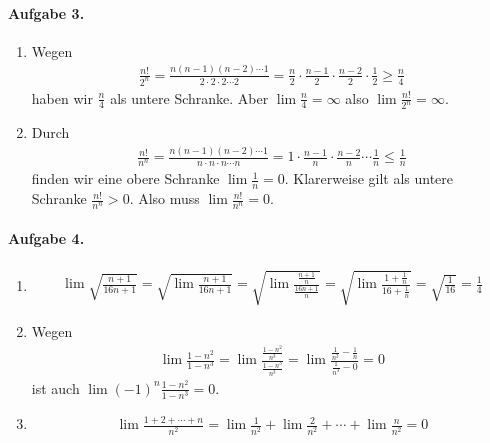 \documentclass{article}
\begin{document}
\paragraph{Aufgabe 3.}
\begin{enumerate} 
    \item
    Wegen
    \begin{align*}
        \frac{n!}{2^n} = \frac{n(n - 1)(n - 2)\cdots 1}{2 \cdot 2 \cdot 2 \cdots 2} = \frac{n}{2} \cdot \frac{n - 1}{2} \cdot \frac{n - 2}{2} \cdot \frac{1}{2} \geq \frac{n}{4}
    \end{align*}
    haben wir $\frac{n}{4}$ als untere Schranke. Aber $\lim \frac{n}{4} = \infty$ also $\lim \frac{n!}{2^n} = \infty$.

    \item Durch \begin{align*}
        \frac{n!}{n^n} = \frac{n(n - 1)(n - 2)\cdots 1}{n \cdot n \cdot n \cdots n} = 1 \cdot \frac{n - 1}{n} \cdot \frac{n - 2}{n} \cdots \frac{1}{n} \leq \frac{1}{n}
    \end{align*}
    finden wir eine obere Schranke $\lim \frac{1}{n} = 0$. Klarerweise gilt als untere Schranke $\frac{n!}{n^n} > 0$. Also muss $\lim \frac{n!}{n^n} = 0$.
\end{enumerate}

\paragraph{Aufgabe 4.}
\begin{enumerate}
    \item \begin{align*}
        \lim \sqrt{\frac{n + 1}{16n + 1}} = \sqrt{\lim \frac{n + 1}{16n + 1}} = \sqrt{\lim \frac{\frac{n + 1}{n}}{\frac{16n + 1}{n}}} = \sqrt{\lim \frac{1 + \frac{1}{n}}{16 + \frac{1}{n}}} = \sqrt{\frac{1}{16}} = \frac{1}{4}
    \end{align*}

    \item Wegen
    \begin{align*}
        \lim \frac{1 - n^2}{1 - n^3} = \lim \frac{\frac{1 - n^2}{n^3}}{\frac{1 - n^3}{n^3}} = \lim \frac{\frac{1}{n^3} - \frac{1}{n}}{\frac{1}{n^3} - 0} = 0
    \end{align*}
    ist auch $\lim (-1)^n \frac{1 - n^2}{1 - n^3} = 0$.

    \item \begin{align*}
        \lim \frac{1 + 2 + \cdots + n}{n^2} = \lim \frac{1}{n^2} + \lim \frac{2}{n^2} + \cdots + \lim \frac{n}{n^2} = 0
    \end{align*}
\end{enumerate}
\end{document}
